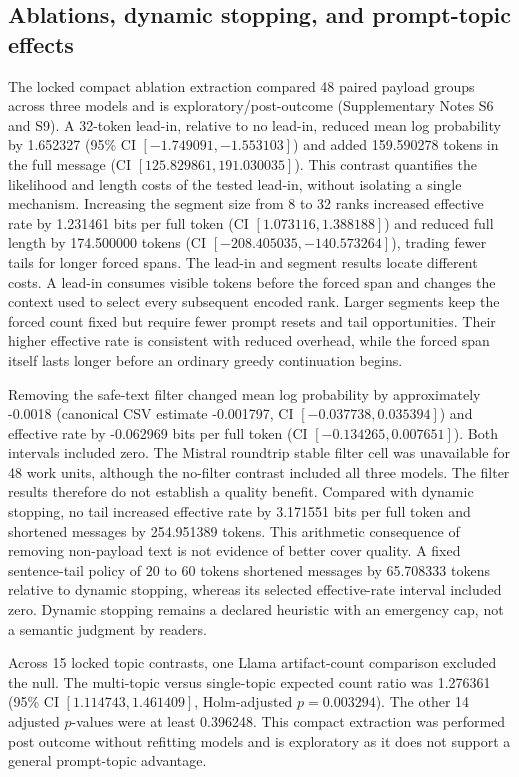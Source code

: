 \documentclass[fleqn,10pt]{wlscirep}
\begin{document}
\subsection*{Ablations, dynamic stopping, and prompt-topic effects}\label{sec:results-ablations}

The locked compact ablation extraction compared 48 paired payload groups across three models and is exploratory/post-outcome (Supplementary Notes S6 and S9). A 32-token lead-in, relative to no lead-in, reduced mean log probability by 1.652327 (95\% CI \([-1.749091,\allowbreak -1.553103]\)) and added 159.590278 tokens in the full message (CI \([125.829861,\allowbreak 191.030035]\)). This contrast quantifies the likelihood and length costs of the tested lead-in, without isolating a single mechanism. Increasing the segment size from 8 to 32 ranks increased effective rate by 1.231461 bits per full token (CI \([1.073116,\allowbreak 1.388188]\)) and reduced full length by 174.500000 tokens (CI \([-208.405035,\allowbreak -140.573264]\)), trading fewer tails for longer forced spans.
The lead-in and segment results locate different costs. A lead-in consumes visible tokens before the forced span and changes the context used to select every subsequent encoded rank. Larger segments keep the forced count fixed but require fewer prompt resets and tail opportunities. Their higher effective rate is consistent with reduced overhead, while the forced span itself lasts longer before an ordinary greedy continuation begins.

Removing the safe-text filter changed mean log probability by approximately -0.0018 (canonical CSV estimate -0.001797, CI \([-0.037738, 0.035394]\)) and effective rate by -0.062969 bits per full token (CI \([-0.134265, 0.007651]\)). Both intervals included zero. The Mistral roundtrip stable filter cell was unavailable for 48 work units, although the no-filter contrast included all three models. The filter results therefore do not establish a quality benefit.
Compared with dynamic stopping, no tail increased effective rate by 3.171551 bits per full token and shortened messages by 254.951389 tokens. This arithmetic consequence of removing non-payload text is not evidence of better cover quality. A fixed sentence-tail policy of \(20\) to \(60\) tokens shortened messages by 65.708333 tokens relative to dynamic stopping, whereas its selected effective-rate interval included zero. Dynamic stopping remains a declared heuristic with an emergency cap, not a semantic judgment by readers.

Across 15 locked topic contrasts, one Llama artifact-count comparison excluded the null. The multi-topic versus single-topic expected count ratio was 1.276361 (95\% CI \([1.114743, 1.461409]\), Holm-adjusted \(p=0.003294\)). The other 14 adjusted \(p\)-values were at least 0.396248. This compact extraction was performed post outcome without refitting models and is exploratory as it does not support a general prompt-topic advantage.
\end{document}
